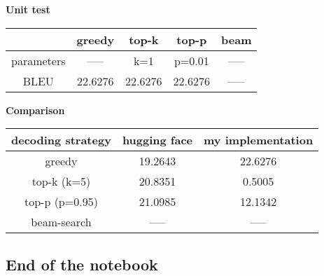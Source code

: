 \documentclass[10pt]{article}
\begin{document}
    \textbf{Unit test}

\begin{longtable}[]{@{}ccccc@{}}
\toprule
& greedy & top-k & top-p & beam\tabularnewline
\midrule
\endhead
parameters & ----- & k=1 & p=0.01 & -----\tabularnewline
BLEU & 22.6276 & 22.6276 & 22.6276 & -----\tabularnewline
\bottomrule
\end{longtable}

    \textbf{Comparison}

\begin{longtable}[]{@{}ccc@{}}
\toprule
decoding strategy & hugging face & my implementation\tabularnewline
\midrule
\endhead
greedy & 19.2643 & 22.6276\tabularnewline
top-k (k=5) & 20.8351 & 0.5005\tabularnewline
top-p (p=0.95) & 21.0985 & 12.1342\tabularnewline
beam-search & ----- & -----\tabularnewline
\bottomrule
\end{longtable}

    \hypertarget{end-of-the-notebook}{%
\subsection*{End of the notebook}\label{end-of-the-notebook}}


    
    
    
\end{document}
